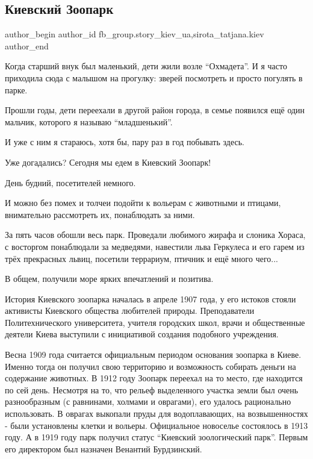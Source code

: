  
 
 
 
 

\subsection{Киевский Зоопарк}
\label{sec:01_07_2023.fb.fb_group.story_kiev_ua.1.kievskij_zoopark}
 
\ifcmt
 author_begin
   author_id fb_group.story_kiev_ua,sirota_tatjana.kiev
 author_end
\fi

Когда старший внук был маленький, дети жили возле \enquote{Охмадета}. И я часто
приходила сюда с малышом на прогулку: зверей посмотреть и просто погулять в
парке.

Прошли годы, дети переехали в другой район города, в семье появился ещё один
мальчик, которого я называю \enquote{младшенький}.

И уже с ним я стараюсь, хотя бы, пару раз в год побывать здесь.

Уже догадались? Сегодня мы едем в Киевский Зоопарк!

День будний, посетителей немного.

И можно без помех и толчеи подойти к вольерам с животными и птицами,
внимательно рассмотреть их, понаблюдать за ними.

За пять часов обошли весь парк. Проведали любимого жирафа и слоника Хораса, с
восторгом понаблюдали за медведями, навестили льва Геркулеса и его гарем из трёх
прекрасных львиц, посетили террариум, птичник и ещё много чего... 

В общем, получили море ярких впечатлений и позитива.

История Киевского зоопарка началась в апреле 1907 года, у его истоков стояли
активисты Киевского общества любителей природы. Преподаватели Политехнического
университета, учителя городских школ, врачи и общественные деятели Киева
выступили с инициативой создания подобного учреждения. 

Весна 1909 года считается официальным периодом основания зоопарка в Киеве.
Именно тогда он получил свою территорию и возможность собирать деньги на
содержание животных. В 1912 году Зоопарк переехал на то место, где находится по
сей день. Несмотря на то, что рельеф выделенного участка земли был очень
разнообразным (с равнинами, холмами и оврагами), его удалось рационально использовать. В
оврагах выкопали пруды для водоплавающих, на возвышенностях - были установлены
клетки и вольеры. Официальное новоселье состоялось в 1913 году.  А в 1919 году
парк получил статус \enquote{Киевский зоологический парк}. Первым его директором был
назначен Венантий Бурдзинский.

